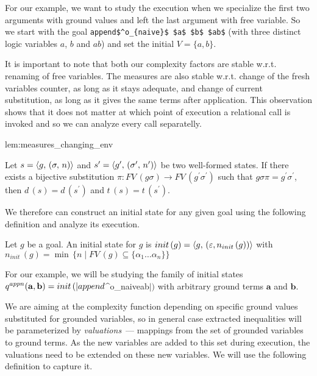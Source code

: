 For our example, we want to study the execution when we specialize the first two arguments with
ground values and left the last argument with free variable. 
So we start with the goal \lstinline|append$^o_{naive}$ $a$ $b$ $ab$| (with three distinct logic variables
$a$, $b$ and $ab$) and set the initial $V = \{ a, b \}$.

It is important to note that both our complexity factors are stable w.r.t. renaming of free
variables.
The measures are also stable w.r.t. change of the fresh variables counter, as long as it stays
adequate, and change of current substitution, as long as it gives the same terms after application.
This observation shows that it does not matter at which point of execution a relational call is invoked and so
we can analyze every call separatelly.

\begin{replemma}{lem:measures_changing_env}

Let $s = \langle g ,\, (\sigma ,\, n) \rangle$ and $s' = \langle g^\prime ,\, (\sigma^\prime ,\, n^\prime) \rangle$ be two well-formed states.
If  there exists a bijective substitution $\pi \colon FV\,(g \sigma) \to FV\,(g^\prime \sigma^\prime)$  such that  $g \sigma \pi = g^\prime \sigma^\prime $, then $d\,(s) = d\,(s^\prime)$ and $t\,(s) = t\,(s^\prime)$.
\end{replemma}

We therefore can construct an initial state for any given goal using the following definition and
analyze its execution.

\begin{definition} Let $g$ be a goal. An initial state for $g$ is $init\,(g)=\langle g ,\, (\varepsilon, n_{init}\,(g)) \rangle $ with $ n_{init}\,(g) = \min\, \{ n \mid FV\,(g) \subseteq \{ \alpha_1\dots\alpha_n \} \} $
\end{definition}

For our example, we will be studying the family of initial states $q^{appn}(\mathbf{a}, \mathbf{b}) = init\,(\lstinline|append$^o_{naive}$ $$ $$ $ab$|)$ with arbitrary ground terms $\mathbf{a}$ and $\mathbf{b}$.

We are aiming at the complexity function depending on specific ground values substituted for grounded variables, so in general case extracted inequalities will be parameterized by \emph{valuations}~--- mappings from the set of grounded variables to ground terms. As the new variables are added to this set during execution, the valuations need to be extended on these new variables. We will use the following definition to capture it.

